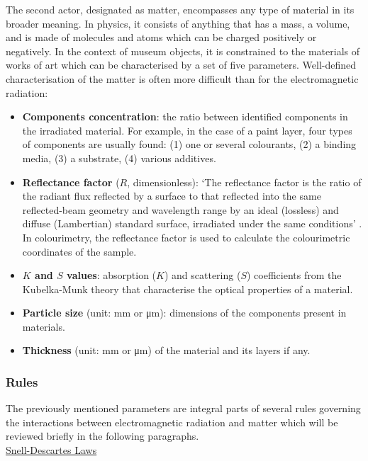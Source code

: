 The second actor, designated as matter, encompasses any type of material in its broader meaning. In physics, it consists of anything that has a mass, a volume, and is made of molecules and atoms which can be charged positively or negatively. In the context of museum objects, it is constrained to the materials of works of art which can be characterised by a set of five parameters. Well-defined characterisation of the matter is often more difficult than for the electromagnetic radiation:

\begin{itemize}
    \item \textbf{Components concentration}: the ratio between identified components in the irradiated material. For example, in the case of a paint layer, four types of components are usually found: (1) one or several colourants, (2) a binding media, (3) a substrate, (4) various additives.
    \item \textbf{Reflectance factor} ($R$, dimensionless): ‘The reflectance factor is the ratio of the radiant flux reflected by a surface to that reflected into the same reflected-beam geometry and wavelength range by an ideal (lossless) and diffuse (Lambertian) standard surface, irradiated under the same conditions’ \citep[29]{schaepman-strub_reflectance_2006}. In colourimetry, the reflectance factor is used to calculate the colourimetric coordinates of the sample. 
    \item \textbf{$K$ and $S$ values}: absorption ($K$) and scattering ($S$) coefficients from the Kubelka-Munk theory that characterise the optical properties of a material. 
    \item \textbf{Particle size} (unit: \unit{\mm} or \unit{\um}): dimensions of the components present in materials.
    \item \textbf{Thickness} (unit: \unit{\mm} or \unit{\um}) of the material and its layers if any. 
\end{itemize}


\subsubsection{Rules}


The previously mentioned parameters are integral parts of several rules governing the interactions between electromagnetic radiation and matter which will be reviewed briefly in the following paragraphs.\\

\newpage
[A] \underline{Snell-Descartes Laws}

